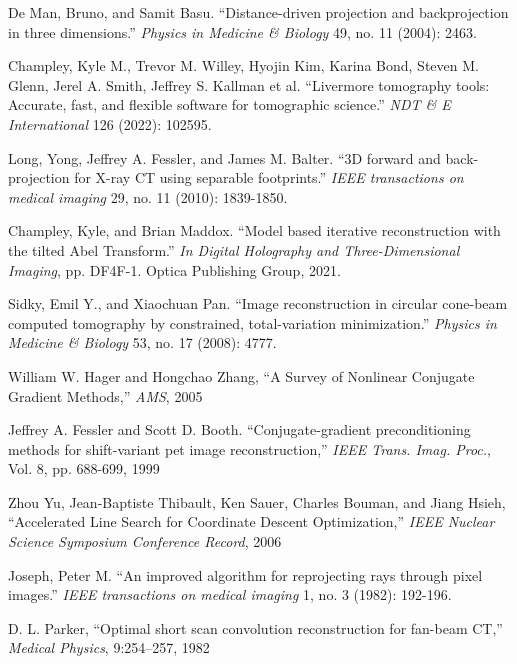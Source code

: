\documentclass[11pt]{article}
\begin{document}
\begin{thebibliography}{100}

 De Man, Bruno, and Samit Basu. ``Distance-driven projection and backprojection in three dimensions.'' \emph{Physics in Medicine \& Biology} 49, no. 11 (2004): 2463.

 Champley, Kyle M., Trevor M. Willey, Hyojin Kim, Karina Bond, Steven M. Glenn, Jerel A. Smith, Jeffrey S. Kallman et al. ``Livermore tomography tools: Accurate, fast, and flexible software for tomographic science.'' \emph{NDT \& E International} 126 (2022): 102595.

 Long, Yong, Jeffrey A. Fessler, and James M. Balter. ``3D forward and back-projection for X-ray CT using separable footprints.'' \emph{IEEE transactions on medical imaging} 29, no. 11 (2010): 1839-1850.

 Champley, Kyle, and Brian Maddox. ``Model based iterative reconstruction with the tilted Abel Transform.'' \emph{In Digital Holography and Three-Dimensional Imaging}, pp. DF4F-1. Optica Publishing Group, 2021.

 Sidky, Emil Y., and Xiaochuan Pan. ``Image reconstruction in circular cone-beam computed tomography by constrained, total-variation minimization.'' \emph{Physics in Medicine \& Biology} 53, no. 17 (2008): 4777.

 William W. Hager and Hongchao Zhang, ``A Survey of Nonlinear Conjugate Gradient Methods,'' \emph{AMS}, 2005

Jeffrey A. Fessler and Scott D. Booth. ``Conjugate-gradient preconditioning methods for shift-variant pet image reconstruction,'' \emph{IEEE Trans. Imag. Proc.}, Vol. 8, pp. 688-699, 1999

 Zhou Yu, Jean-Baptiste Thibault, Ken Sauer, Charles Bouman, and Jiang Hsieh, ``Accelerated Line Search for Coordinate Descent
Optimization,'' \emph{IEEE Nuclear Science Symposium Conference Record}, 2006

 Joseph, Peter M. ``An improved algorithm for reprojecting rays through pixel images.'' \emph{IEEE transactions on medical imaging} 1, no. 3 (1982): 192-196.

 D. L. Parker, ``Optimal short scan convolution reconstruction for fan-beam CT,'' \emph{Medical Physics}, 9:254–257, 
1982


\end{thebibliography}
\end{document}
